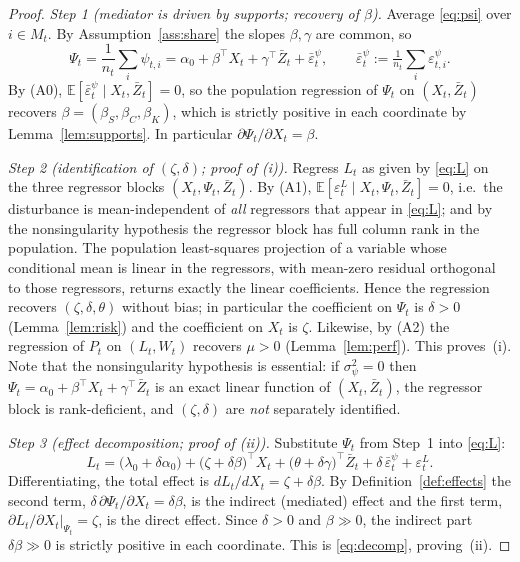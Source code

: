 \documentclass{amsart}
\theoremstyle{definition}
\theoremstyle{remark}
\begin{document}
\begin{proof}
\emph{Step 1 (mediator is driven by supports; recovery of $\beta$).}
Average \eqref{eq:psi} over $i\in M_t$. By Assumption~\ref{ass:share} the
slopes $\beta,\gamma$ are common, so
\[
\Psi_t=\frac1{n_t}\sum_i\psi_{t,i}
=\alpha_0+\beta^\top X_t+\gamma^\top \bar Z_t
+\bar\varepsilon^\psi_t,\qquad
\bar\varepsilon^\psi_t:=\tfrac1{n_t}\textstyle\sum_i\varepsilon^\psi_{t,i}.
\]
By (A0), $\mathbb{E}[\bar\varepsilon^\psi_t\mid X_t,\bar Z_t]=0$, so the
population regression of $\Psi_t$ on $(X_t,\bar Z_t)$ recovers
$\beta=(\beta_S,\beta_C,\beta_K)$, which is strictly positive in each
coordinate by Lemma~\ref{lem:supports}. In particular
$\partial\Psi_t/\partial X_t=\beta$.

\emph{Step 2 (identification of $(\zeta,\delta)$; proof of (i)).}
Regress $L_t$ as given by \eqref{eq:L} on the three regressor blocks
$(X_t,\Psi_t,\bar Z_t)$. By (A1),
$\mathbb{E}[\varepsilon^L_t\mid X_t,\Psi_t,\bar Z_t]=0$, i.e.\ the
disturbance is mean-independent of \emph{all} regressors that appear in
\eqref{eq:L}; and by the nonsingularity hypothesis the regressor block has
full column rank in the population. The population least-squares projection
of a variable whose conditional mean is linear in the regressors, with
mean-zero residual orthogonal to those regressors, returns exactly the
linear coefficients. Hence the regression recovers
$(\zeta,\delta,\theta)$ without bias; in particular the coefficient on
$\Psi_t$ is $\delta>0$ (Lemma~\ref{lem:risk}) and the coefficient on
$X_t$ is $\zeta$. Likewise, by (A2) the regression of $P_t$ on
$(L_t,W_t)$ recovers $\mu>0$ (Lemma~\ref{lem:perf}). This proves~(i).
Note that the nonsingularity hypothesis is essential: if $\sigma^2_\psi=0$
then $\Psi_t=\alpha_0+\beta^\top X_t+\gamma^\top\bar Z_t$ is an exact
linear function of $(X_t,\bar Z_t)$, the regressor block is
rank-deficient, and $(\zeta,\delta)$ are \emph{not} separately identified.

\emph{Step 3 (effect decomposition; proof of (ii)).}
Substitute $\Psi_t$ from Step~1 into \eqref{eq:L}:
\begin{equation}\label{eq:reduced}
L_t=\big(\lambda_0+\delta\alpha_0\big)
+\big(\zeta+\delta\beta\big)^\top X_t
+\big(\theta+\delta\gamma\big)^\top\bar Z_t
+\delta\,\bar\varepsilon^\psi_t
+\varepsilon^L_t .
\end{equation}
Differentiating, the total effect is
$dL_t/dX_t=\zeta+\delta\beta$. By Definition~\ref{def:effects} the second
term, $\delta\,\partial\Psi_t/\partial X_t=\delta\beta$, is the indirect
(mediated) effect and the first term, $\partial L_t/\partial X_t|_{\Psi_t}
=\zeta$, is the direct effect. Since $\delta>0$ and $\beta\gg0$, the
indirect part $\delta\beta\gg0$ is strictly positive in each coordinate.
This is \eqref{eq:decomp}, proving~(ii).


\end{proof}
\end{document}
